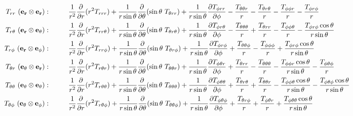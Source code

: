 \documentclass[11pt]{article}
\newcommand{\dr}{\frac{\partial}{\partial r}}
\begin{document}
\begin{landscape}
\begin{align}
T_{rr} \ ({\bf{e_r \otimes e_r}}): & \hspace{1cm} \frac{1}{r^2}\dr (r^2 T_{rrr}) + \frac{1}{r\sin{\theta}}\frac{\partial}{\partial \theta} (\sin{\theta} \ T_{\theta rr}) + \frac{1}{r\sin{\theta}}\frac{\partial T_{\phi rr}}{\partial \phi} - \frac{T_{\theta\theta r}}{r} - \frac{T_{\theta r \theta}}{r} -\frac{T_{\phi\phi r}}{r} - \frac{T_{\phi r \phi}}{r} \\
T_{r\theta} \ ({\bf{e_r \otimes e_\theta}}): & \hspace{1cm} \frac{1}{r^2}\dr (r^2 T_{rr \theta}) + \frac{1}{r\sin{\theta}}\frac{\partial}{\partial \theta} (\sin{\theta} \ T_{\theta r \theta}) + \frac{1}{r\sin{\theta}}\frac{\partial T_{\phi r \theta}}{\partial \phi} - \frac{T_{\theta \theta \theta}}{r} + \frac{T_{\theta rr}}{r} - \frac{T_{\phi \phi \theta}}{r} - \frac{T_{\phi r \phi} \cos{\theta}}{r\sin{\theta}} \\
T_{r \phi} \ ({\bf{e_r \otimes e_\phi}}): & \hspace{1cm} \frac{1}{r^2}\dr (r^2 T_{rr \phi}) + \frac{1}{r\sin{\theta}}\frac{\partial}{\partial \theta} (\sin{\theta} \ T_{\theta r \phi}) + \frac{1}{r\sin{\theta}}\frac{\partial T_{\phi r \phi}}{\partial \phi} + \frac{T_{\theta \theta \phi}}{r} - \frac{T_{\phi \phi \phi}}{r} + \frac{T_{\phi r \phi} \cos{\theta}}{r\sin{\theta}} \\
T_{\theta r} \ ({\bf{e_\theta \otimes e_r}}): & \hspace{1cm} \frac{1}{r^2}\dr (r^2 T_{r \theta r}) + \frac{1}{r\sin{\theta}}\frac{\partial}{\partial \theta} (\sin{\theta} \ T_{\theta \theta r}) + \frac{1}{r\sin{\theta}}\frac{\partial T_{\phi \theta r}}{\partial \phi} + \frac{T_{\theta rr}}{r} - \frac{T_{\theta \theta \theta}}{r} -\frac{T_{\phi \phi r} \cos{\theta}}{r \sin{\theta}} - \frac{T_{\phi \theta \phi}}{r}  \\
T_{\theta \theta} \ ({\bf{e_\theta \otimes e_\theta}}): & \hspace{1cm} \frac{1}{r^2}\dr (r^2 T_{r \theta \theta}) + \frac{1}{r\sin{\theta}}\frac{\partial}{\partial \theta} (\sin{\theta} \ T_{\theta \theta \theta}) + \frac{1}{r\sin{\theta}}\frac{\partial T_{\phi \theta \theta}}{\partial \phi} + \frac{T_{\theta r \theta}}{r} + \frac{T_{\theta \theta r}}{r} - \frac{T_{\phi \phi \theta} \cos{\theta}}{r\sin{\theta}} - \frac{T_{\phi \theta \phi} \cos{\theta}}{r\sin{\theta}} \\
T_{\theta \phi} \ ({\bf{e_\theta \otimes e_\phi}}): & \hspace{1cm} \frac{1}{r^2}\dr (r^2 T_{r \theta \phi}) + \frac{1}{r\sin{\theta}}\frac{\partial}{\partial \theta} (\sin{\theta} \ T_{\theta \theta \phi}) + \frac{1}{r\sin{\theta}}\frac{\partial T_{\phi \theta \phi}}{\partial \phi} + \frac{T_{\theta r \phi}}{r} + \frac{T_{\phi \theta r}}{r} + \frac{T_{\phi \theta \theta} \cos{\theta}}{r\sin{\theta}} \\

\end{align}
\end{landscape}
\end{document}
